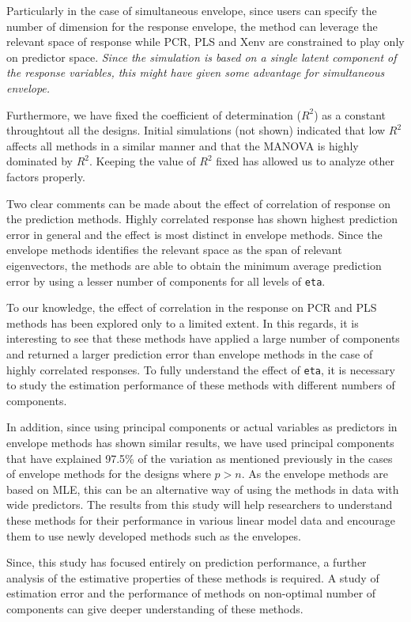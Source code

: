 \documentclass[review]{elsarticle}
\begin{document}
Particularly in the case of simultaneous envelope, since users can
specify the number of dimension for the response envelope, the method
can leverage the relevant space of response while PCR, PLS and Xenv are
constrained to play only on predictor space. \emph{Since the simulation
is based on a single latent component of the response variables, this
might have given some advantage for simultaneous envelope.}

Furthermore, we have fixed the coefficient of determination (\(R^2\)) as
a constant throughtout all the designs. Initial simulations (not shown)
indicated that low \(R^2\) affects all methods in a similar manner and
that the MANOVA is highly dominated by \(R^2\). Keeping the value of
\(R^2\) fixed has allowed us to analyze other factors properly.

Two clear comments can be made about the effect of correlation of
response on the prediction methods. Highly correlated response has shown
highest prediction error in general and the effect is most distinct in
envelope methods. Since the envelope methods identifies the relevant
space as the span of relevant eigenvectors, the methods are able to
obtain the minimum average prediction error by using a lesser number of
components for all levels of \texttt{eta}.

To our knowledge, the effect of correlation in the response on PCR and
PLS methods has been explored only to a limited extent. In this regards,
it is interesting to see that these methods have applied a large number
of components and returned a larger prediction error than envelope
methods in the case of highly correlated responses. To fully understand
the effect of \texttt{eta}, it is necessary to study the estimation
performance of these methods with different numbers of components.

In addition, since using principal components or actual variables as
predictors in envelope methods has shown similar results, we have used
principal components that have explained 97.5\% of the variation as
mentioned previously in the cases of envelope methods for the designs
where \(p>n\). As the envelope methods are based on MLE, this can be an
alternative way of using the methods in data with wide predictors. The
results from this study will help researchers to understand these
methods for their performance in various linear model data and encourage
them to use newly developed methods such as the envelopes.

Since, this study has focused entirely on prediction performance, a
further analysis of the estimative properties of these methods is
required. A study of estimation error and the performance of methods on
non-optimal number of components can give deeper understanding of these
methods.
\end{document}

